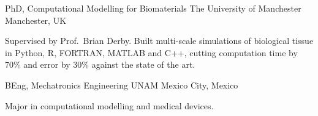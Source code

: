 
\begin{cventries}

\cventry
{PhD, Computational Modelling for Biomaterials}
{The University of Manchester}
{Manchester, UK}
{}
{
\begin{cvitems}
  \item {Supervised by Prof.~Brian Derby. Built multi-scale simulations of biological tissue in Python, R, FORTRAN, MATLAB and C++, cutting computation time by 70\% and error by 30\% against the state of the art.}
\end{cvitems}
}

\cventry
{BEng, Mechatronics Engineering}
{UNAM}
{Mexico City, Mexico}
{}
{
\begin{cvitems}
  \item {Major in computational modelling and medical devices.}
\end{cvitems}
}

\end{cventries}
